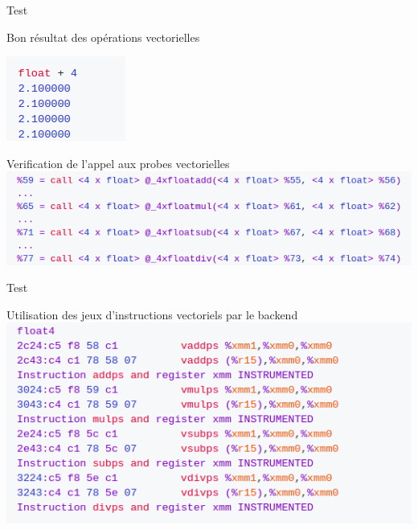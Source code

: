 \documentclass{beamer}
\begin{document}
\begin{frame}{Test}

  \begin{block}{Bon résultat des opérations vectorielles}
    

  \centering\includegraphics[scale=0.8]{../ressources/bon_resultat.png}

    
  \end{block}

  \begin{block}{Verification de l'appel aux probes vectorielles}
\centering\includegraphics[scale=0.5]{../ressources/appel_des_fonction.png}
  \end{block}
\end{frame}

\begin{frame}{Test}

\begin{block}{Utilisation des jeux d'instructions vectoriels par le backend}
\centering\includegraphics[scale=0.5]{../ressources/ajout_instructions.png}
  \end{block}
\end{frame}
\end{document}
